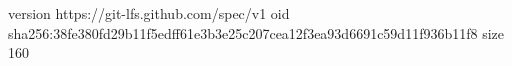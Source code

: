 version https://git-lfs.github.com/spec/v1
oid sha256:38fe380fd29b11f5edff61e3b3e25c207cea12f3ea93d6691c59d11f936b11f8
size 160
